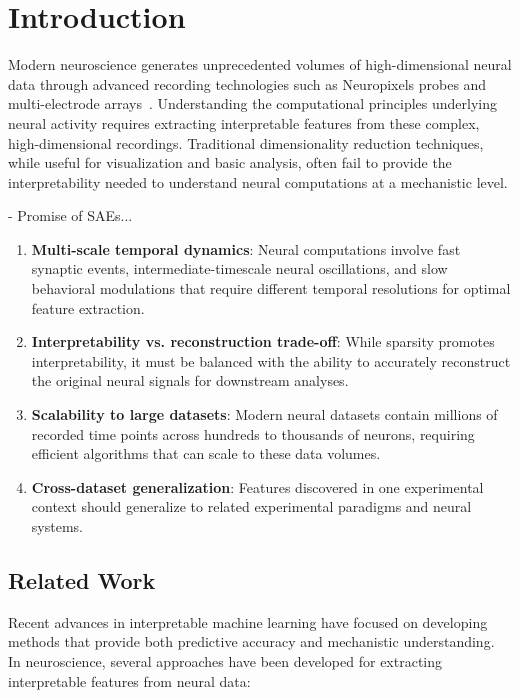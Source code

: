 \section{Introduction}

Modern neuroscience generates unprecedented volumes of high-dimensional neural data through advanced recording technologies such as Neuropixels probes and multi-electrode arrays~\cite{steinmetz2021neuropixels, raducanu2017neuroseeker, cai2016miniature, li2017large}. Understanding the computational principles underlying neural activity requires extracting interpretable features from these complex, high-dimensional recordings. Traditional dimensionality reduction techniques, while useful for visualization and basic analysis, often fail to provide the interpretability needed to understand neural computations at a mechanistic level.

- Promise of SAEs...

\begin{enumerate}
\item \textbf{Multi-scale temporal dynamics}: Neural computations involve fast synaptic events, intermediate-timescale neural oscillations, and slow behavioral modulations that require different temporal resolutions for optimal feature extraction.

\item \textbf{Interpretability vs. reconstruction trade-off}: While sparsity promotes interpretability, it must be balanced with the ability to accurately reconstruct the original neural signals for downstream analyses.

\item \textbf{Scalability to large datasets}: Modern neural datasets contain millions of recorded time points across hundreds to thousands of neurons, requiring efficient algorithms that can scale to these data volumes.

\item \textbf{Cross-dataset generalization}: Features discovered in one experimental context should generalize to related experimental paradigms and neural systems.
\end{enumerate}

\subsection{Related Work}

Recent advances in interpretable machine learning have focused on developing methods that provide both predictive accuracy and mechanistic understanding. In neuroscience, several approaches have been developed for extracting interpretable features from neural data:

